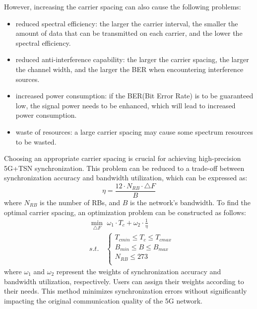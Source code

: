 \documentclass[english]{cccconf}
\begin{document}
However, increasing the carrier spacing can also cause the following problems:
\begin{itemize}
	\item reduced spectral efficiency: the larger the carrier interval, the smaller the amount of data that can be transmitted on each carrier, and the lower the spectral efficiency.
	
	\item reduced anti-interference capability: the larger the carrier spacing, the larger the channel width, and the larger the BER when encountering interference sources.
	
	\item increased power consumption: if the BER(Bit Error Rate) is to be guaranteed low, the signal power needs to be enhanced, which will lead to increased power consumption.
	
	\item waste of resources: a large carrier spacing may cause some spectrum resources to be wasted.
\end{itemize}
Choosing an appropriate carrier spacing is crucial for achieving high-precision 5G+TSN synchronization. This problem can be reduced to a trade-off between synchronization accuracy and bandwidth utilization, which can be expressed as:
\begin{equation}
	\eta=\frac{12\cdot N_{RB}\cdot \triangle F}{B}
\end{equation}
where $N_{RB}$ is the number of RBs, and $B$ is the network's bandwidth. To find the optimal carrier spacing, an optimization problem can be constructed as follows:
\begin{equation}
	\begin{split}
		&\min_{\triangle F} \,\, \omega_1 \cdot T_c+\omega_2 \cdot \frac{1}{\eta} \\
		&s.t.\quad  \left\{\begin{array}{lc}
			T_{cmin}\leq T_c \leq T_{cmax}\\
			B_{min}\leq B \leq B_{max}\\
			N_{RB}\leq 273\\
		\end{array}\right.
	\end{split}
\end{equation}
where $\omega_1$ and $\omega_2$ represent the weights of synchronization accuracy and bandwidth utilization, respectively. Users can assign their weights according to their needs. This method minimizes synchronization errors without significantly impacting the original communication quality of the 5G network.
\end{document}

